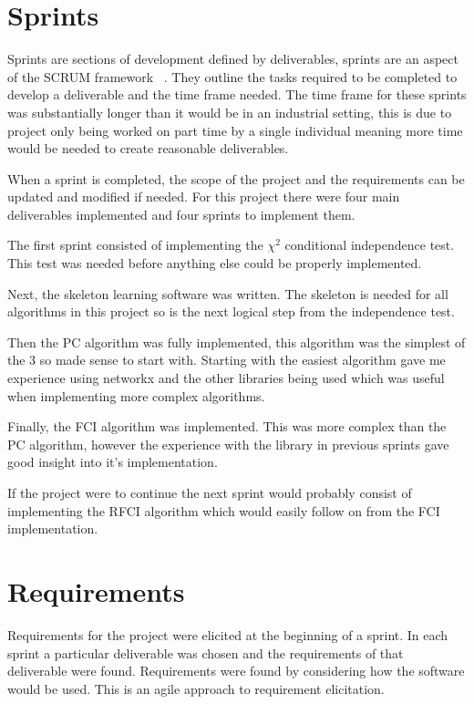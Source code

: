 \documentclass{UoYCSproject}
\begin{document}
\section{Sprints}
Sprints are sections of development defined by deliverables, sprints are an aspect of the SCRUM framework ~\parencite{schwaber1997scrum}. They outline the tasks required to be completed to develop a deliverable and the time frame needed. The time frame for these sprints was substantially longer than it would be in an industrial setting, this is due to project only being worked on part time by a single individual meaning more time would be needed to create reasonable deliverables.

When a sprint is completed, the scope of the project and the requirements can be updated and modified if needed. For this project there were four main deliverables implemented and four sprints to implement them.

The first sprint consisted of implementing the $\chi ^2$ conditional independence test. This test was needed before anything else could be properly implemented.

Next, the skeleton learning software was written. The skeleton is needed for all algorithms in this project so is the next logical step from the independence test.

Then the PC algorithm was fully implemented, this algorithm was the simplest of the 3 so made sense to start with. Starting with the easiest algorithm gave me experience using networkx and the other libraries being used which was useful when implementing more complex algorithms.

Finally, the FCI algorithm was implemented. This was more complex than the PC algorithm, however the experience with the library in previous sprints gave good insight into it's implementation.

If the project were to continue the next sprint would probably consist of implementing the RFCI algorithm which would easily follow on from the FCI implementation.

\section{Requirements}
Requirements for the project were elicited at the beginning of a sprint. In each sprint a particular deliverable was chosen and the requirements of that deliverable were found. Requirements were found by considering how the software would be used. This is an agile approach to requirement elicitation.
\end{document}
